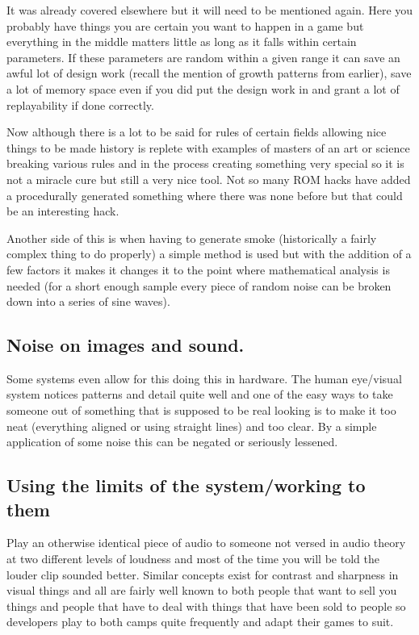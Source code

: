 \documentclass[
]{book}
\begin{document}
It was already covered elsewhere but it will need to be mentioned again. Here you probably have things you are certain you want to happen in a game but everything in the middle matters little as long as it falls within certain parameters. If these parameters are random within a given range it can save an awful lot of design work (recall the mention of growth patterns from earlier), save a lot of memory space even if you did put the design work in and grant a lot of replayability if done correctly.

Now although there is a lot to be said for rules of certain fields allowing nice things to be made history is replete with examples of masters of an art or science breaking various rules and in the process creating something very special so it is not a miracle cure but still a very nice tool. Not so many ROM hacks have added a procedurally generated something where there was none before but that could be an interesting hack.

Another side of this is when having to generate smoke (historically a fairly complex thing to do properly) a simple method is used but with the addition of a few factors it makes it changes it to the point where mathematical analysis is needed (for a short enough sample every piece of random noise can be broken down into a series of sine waves).

\hypertarget{noise-on-images-and-sound.}{%
\subsection{Noise on images and sound.}\label{noise-on-images-and-sound.}}

Some systems even allow for this doing this in hardware. The human eye/visual system notices patterns and detail quite well and one of the easy ways to take someone out of something that is supposed to be real looking is to make it too neat (everything aligned or using straight lines) and too clear. By a simple application of some noise this can be negated or seriously lessened.

\hypertarget{using-the-limits-of-the-systemworking-to-them}{%
\subsection{Using the limits of the system/working to them}\label{using-the-limits-of-the-systemworking-to-them}}

Play an otherwise identical piece of audio to someone not versed in audio theory at two different levels of loudness and most of the time you will be told the louder clip sounded better. Similar concepts exist for contrast and sharpness in visual things and all are fairly well known to both people that want to sell you things and people that have to deal with things that have been sold to people so developers play to both camps quite frequently and adapt their games to suit.
\end{document}
